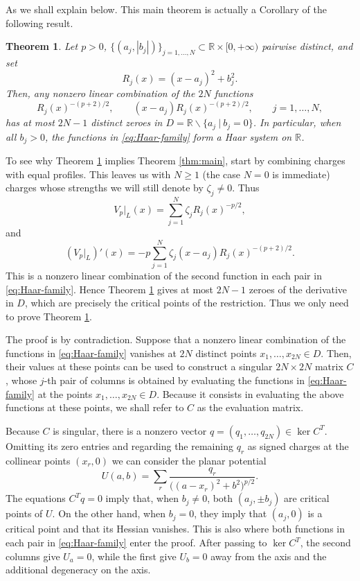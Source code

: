 \documentclass[leqno,11pt]{amsart}
\numberwithin{equation}{section}
\newcommand{\bbR}{\mathbb{R}}
\newtheorem{theorem}{Theorem}
\theoremstyle{definition}
\begin{document}
	As we shall explain below. This main theorem is actually a Corollary of the following result.
	
	\begin{theorem}\label{thm:Haar}
		Let $p>0$, $\{(a_j,|b_j|)\}_{j=1,\ldots,N} \subset \bbR\times[0,+\infty)$ pairwise distinct, and set
		\[
		R_j(x)=(x-a_j)^2+b_j^2.
		\]
		Then, any nonzero linear combination of the $2N$ functions
		\begin{equation}\label{eq:Haar-family}
			R_j(x)^{-(p+2)/2},\qquad
			(x-a_j)R_j(x)^{-(p+2)/2},\qquad j=1,\ldots,N,
		\end{equation}
		has at most $2N-1$ distinct zeroes in $D=\bbR\backslash\{a_j \ | \ b_j=0\}$. In particular, when all $b_j>0$, the functions in \eqref{eq:Haar-family} form a Haar system on $\bbR$.
	\end{theorem}
	
	To see why Theorem \ref{thm:Haar} implies Theorem \ref{thm:main}, start by combining charges with equal profiles. This leaves us with $N\geq1$ (the case $N=0$ is immediate) charges whose strengths we will still denote by $\zeta_j\neq0$. Thus
	\[
	V_p|_L(x)=\sum_{j=1}^N \zeta_jR_j(x)^{-p/2},
	\]
	and
	\begin{equation}\label{eq:restricted-derivative-intro}
		(V_p|_L)'(x)
		=-p\sum_{j=1}^N \zeta_j(x-a_j)R_j(x)^{-(p+2)/2}.
	\end{equation}
	This is a nonzero linear combination of the second function in each pair in \eqref{eq:Haar-family}. Hence Theorem \ref{thm:Haar} gives at most $2N-1$ zeroes of the derivative in $D$, which are precisely the critical points of the restriction. Thus we only need to prove Theorem \ref{thm:Haar}.
	
	The proof is by contradiction. Suppose that a nonzero linear combination of the functions in \eqref{eq:Haar-family} vanishes at $2N$ distinct points $x_1,\ldots,x_{2N}\in D$. Then, their values at these points can be used to construct a singular $2N\times2N$ matrix $C$, whose $j$-th pair of columns is obtained by evaluating the functions in \eqref{eq:Haar-family} at the points $x_1,\ldots,x_{2N}\in D$.
	Because it consists in evaluating the above functions at these points, we shall refer to $C$ as the evaluation matrix.
	
	Because $C$ is singular, there is a nonzero vector $q=(q_1,\ldots,q_{2N})\in\ker C^T$. Omitting its zero entries and regarding the remaining $q_r$ as signed charges at the collinear points $(x_r,0)$ we can consider the planar potential
	\begin{equation}\label{eq:aux-intro}
		U(a,b)=\sum_r \frac{q_r}{\big((a-x_r)^2+b^2\big)^{p/2}}.
	\end{equation}
	The equations $C^Tq=0$ imply that, when $b_j \neq 0$, both $(a_j,\pm b_j)$ are critical points of $U$. On the other hand, when $b_j=0$, they imply that $(a_j,0)$ is a critical point and that its Hessian vanishes. This is also where both functions in each pair in \eqref{eq:Haar-family} enter the proof. After passing to $\ker C^T$, the second columns give $U_a=0$, while the first give $U_b=0$ away from the axis and the additional degeneracy on the axis.
	
\end{document}
